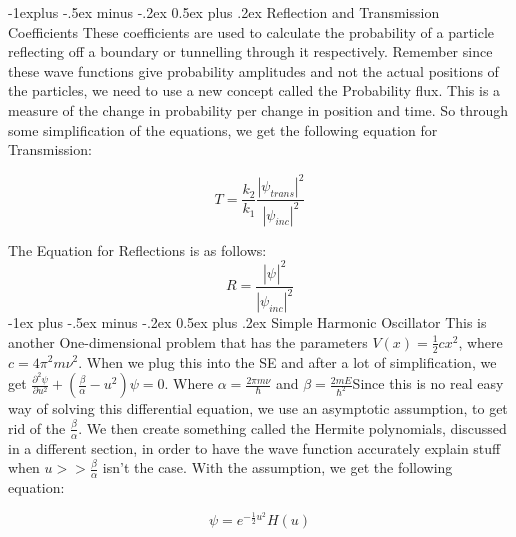 \documentclass[10pt,landscape]{article}
\makeatletter
\renewcommand{\section}{\@startsection{section}{1}{0mm}%
                                {-1ex plus -.5ex minus -.2ex}%
                                {0.5ex plus .2ex}%
                                {\normalfont\large\bfseries}}
\renewcommand{\subsection}{\@startsection{subsection}{2}{0mm}%
                                {-1explus -.5ex minus -.2ex}%
                                {0.5ex plus .2ex}%
                                {\normalfont\normalsize\bfseries}}
\makeatother
\begin{document}
\begin{multicols}{3}
\begin{itemize}
\end{itemize}
\subsection{Reflection and Transmission Coefficients}
These coefficients are used to calculate the probability of a particle reflecting off a boundary or tunnelling through it respectively. Remember since these wave functions give probability amplitudes and not the actual positions of the particles, we need to use a new concept called the Probability flux. This is a measure of the change in probability per change in position and time. So through some simplification of the equations, we get the following equation for Transmission:

\begin{equation*}
    T=\frac{k_2}{k_1}\frac{|\psi_{trans}|^2}{|\psi_{inc}|^2}
\end{equation*}

The Equation for Reflections is as follows:
\begin{equation*}
    R=\frac{|\psi_{}|^2}{|\psi_{inc}|^2}
\end{equation*}
\section{Simple Harmonic Oscillator}
This is another One-dimensional problem that has the parameters $V(x)=\frac{1}{2}cx^2$, where $c=4\pi^2m\nu^2$. When we plug this into the SE and after a lot of simplification, we get $\frac{\partial^2\psi}{\partial u^2}+(\frac{\beta}{\alpha}-u^2)\psi=0$. Where $\alpha=\frac{2\pi m \nu}{\hbar}$ and $\beta=\frac{2mE}{\hbar^2}$Since this is no real easy way of solving this differential equation, we use an asymptotic assumption, to get rid of the $\frac{\beta}{\alpha}$. We then create something called the Hermite polynomials, discussed in a different section, in order to have the wave function accurately explain stuff when $u>>\frac{\beta}{\alpha}$ isn't the case. With the assumption, we get the following equation:

\begin{equation*}
    \psi=e^{-\frac{1}{2}u^2}H(u)
\end{equation*}


\end{multicols}
\end{document}
